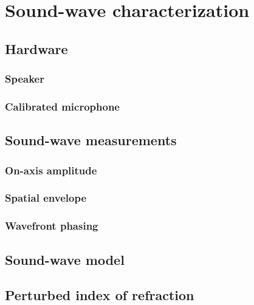 \chapter{Sound-wave characterization}
\label{app:SoundWaveCharacterization}


\section{Hardware}
\subsection{Speaker}
\subsection{Calibrated microphone}


\section{Sound-wave measurements}
\subsection{On-axis amplitude}
\subsection{Spatial envelope}
\subsection{Wavefront phasing}


\section{Sound-wave model}


\section{Perturbed index of refraction}




